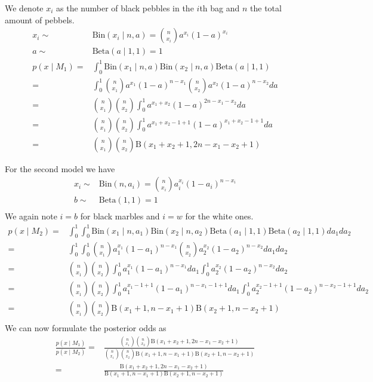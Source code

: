\documentclass{article}
\begin{document}
We denote $x_i$ as the number of black pebbles in the $i$th bag and $n$ the total amount of pebbels. 
\begin{align}
	x_i \sim& \text{Bin}(x_i \mid n,a) = {n \choose x_i}a^{x_i}(1-a)^{x_i}\\
	a \sim& \text{Beta}(a \mid 1,1) = 1 \\
	p(x\mid M_1) =&  \int_0^1 \text{Bin}(x_1 \mid n,a)\text{Bin}(x_2 \mid n,a)\text{Beta}(a \mid 1,1)\\
	=& \int_0^1 {n \choose x_1}a^{x_1}(1-a)^{n-x_1}{n \choose x_2}a^{x_2}(1-a)^{n-x_2} da\\
	=& {n \choose x_1}{n \choose x_2}\int_0^1 a^{x_1+x_2}(1-a)^{2n-x_1-x_2} da \\
	=& {n \choose x_1}{n \choose x_2}\int_0^1 a^{x_1+x_2-1+1}(1-a)^{x_1+x_2-1+1} da\\
	=& {n \choose x_1}{n \choose x_2}\text{B}(x_1+x_2+1, 2n - x_1-x_2 + 1)
\end{align}

For the second model we have 
\begin{align}
	x_i \sim& \text{Bin}(n,a_i) = {n \choose x_i}a_i^{x_i}(1-a_i)^{n-x_i} \\
	b \sim& \text{Beta}(1,1) = 1\\
\end{align}
We again note $i=b$ for black marbles and $i=w$ for the white ones.
\begin{align}
	p(x\mid M_2) =&  \int_0^1\int_0^1 \text{Bin}(x_1 \mid n,a_1)\text{Bin}(x_2 \mid n,a_2)\text{Beta}(a_1 \mid 1,1)\text{Beta}(a_2 \mid 1,1)da_1da_2\\
	=&  \int_0^1\int_0^1 {n \choose x_1}a_1^{x_1}(1-a_1)^{n-x_1}{n \choose x_2}a_2^{x_2}(1-a_2)^{n-x_2}da_1da_2\\
	=&  {n \choose x_1}{n \choose x_2}\int_0^1a_1^{x_1}(1-a_1)^{n-x_1} da_1\int_0^1 a_2^{x_2}(1-a_2)^{n-x_2}da_2\\
	=&  {n \choose x_1}{n \choose x_2}\int_0^1a_1^{x_1-1+1}(1-a_1)^{n-x_1-1+1} da_1\int_0^1 a_2^{x_2-1+1}(1-a_2)^{n-x_2-1+1}da_2\\
	=&  {n \choose x_1}{n \choose x_2}\text{B}(x_1+1,n-x_1+1) \text{B}(x_2+1,n-x_2+1)\\
\end{align}
We can now formulate the posterior odds as 
\begin{align}
	\frac{p(x\mid M_1)}{p(x\mid M_2)} =& \frac{{n \choose x_1}{n \choose x_2}\text{B}(x_1+x_2+1, 2n - x_1-x_2 + 1)}{{n \choose x_1}{n \choose x_2}\text{B}(x_1+1,n-x_1+1) \text{B}(x_2+1,n-x_2+1)}\\
	=& \frac{\text{B}(x_1+x_2+1, 2n - x_1-x_2 + 1)}{\text{B}(x_1+1,n-x_1+1) \text{B}(x_2+1,n-x_2+1)}
\end{align}
\end{document}
